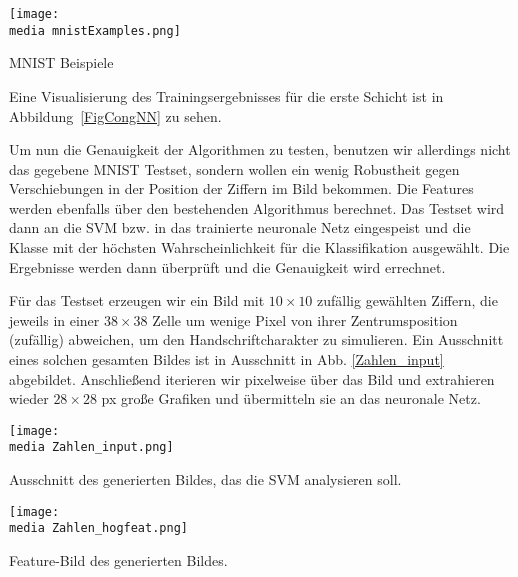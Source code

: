\begin{dsafigure}
	\begin{center}
		\texttt{[image: \\media mnistExamples.png]}
		\caption{MNIST Beispiele}
		\label{FigConvNN}
	\end{center}
\end{dsafigure}

Eine Visualisierung des Trainingsergebnisses f\"ur die erste Schicht ist in Abbildung~\eqref{FigCongNN} zu sehen.

Um nun die Genauigkeit der Algorithmen zu testen, benutzen wir allerdings nicht das gegebene MNIST Testset, sondern wollen ein wenig Robustheit gegen Verschiebungen in der Position der Ziffern im Bild bekommen. Die Features werden ebenfalls über den bestehenden Algorithmus berechnet. Das Testset wird dann an die SVM bzw. in das trainierte neuronale Netz eingespeist und die Klasse mit der h\"ochsten Wahrscheinlichkeit f\"ur die Klassifikation ausgew\"ahlt. Die Ergebnisse werden dann überprüft und die Genauigkeit wird errechnet.

F\"ur das Testset erzeugen wir ein Bild mit $10 \times 10$ zufällig gewählten Ziffern, die jeweils in einer $38 \times 38$ Zelle um wenige Pixel von ihrer Zentrumsposition (zuf\"allig) abweichen, um den Handschriftcharakter zu simulieren. Ein Ausschnitt eines solchen gesamten Bildes ist in Ausschnitt in Abb. \ref{Zahlen_input} abgebildet. Anschließend iterieren wir pixelweise über das Bild und extrahieren wieder $28 \times 28$ px große Grafiken und übermitteln sie an das neuronale Netz.

\begin{dsafigure}
\begin{center}
	\texttt{[image: \\media Zahlen\_input.png]}
	\caption{Ausschnitt des generierten Bildes, das die SVM analysieren soll.}
	\label{Zahlen_input}
\end{center}
\end{dsafigure}

\begin{dsafigure}
\begin{center}
	\texttt{[image: \\media Zahlen\_hogfeat.png]}
	\caption{Feature-Bild des generierten Bildes.}
	\label{Zahlen_hogfeat}
\end{center}
\end{dsafigure}

